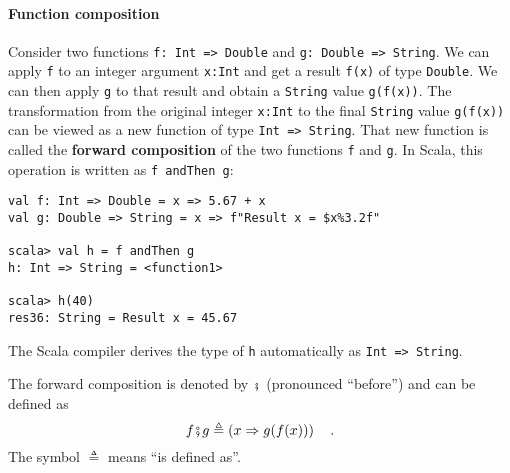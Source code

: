 \paragraph{Function composition}

Consider two functions \lstinline!f: Int => Double!
and \lstinline!g: Double => String!.
We can apply \lstinline!f!
to an integer argument \lstinline!x:Int!
and get a result \lstinline!f(x)!
of type \lstinline!Double!.
We can then apply \lstinline!g!
to that result and obtain a \lstinline!String!
value \lstinline!g(f(x))!.
The transformation from the original integer \lstinline!x:Int!
to the final \lstinline!String!
value \lstinline!g(f(x))!
can be viewed as a new function of type \lstinline!Int => String!.
That new function is called the \textbf{forward composition}
of the two functions \lstinline!f!
and \lstinline!g!. In Scala,
this operation is written as \lstinline!f andThen g!:
\begin{lstlisting}
val f: Int => Double = x => 5.67 + x
val g: Double => String = x => f"Result x = $x%3.2f"

scala> val h = f andThen g
h: Int => String = <function1>

scala> h(40)
res36: String = Result x = 45.67
\end{lstlisting}
The Scala compiler derives the type of \lstinline!h!
automatically as \lstinline!Int => String!.

The forward composition is denoted by $\bef$ (pronounced ``before'')
and can be defined as
\begin{equation}
f\bef g\triangleq\left(x\Rightarrow g(f(x))\right)\quad.\label{eq:def-of-forward-composition}
\end{equation}
The symbol $\triangleq$ means ``is defined as''.

